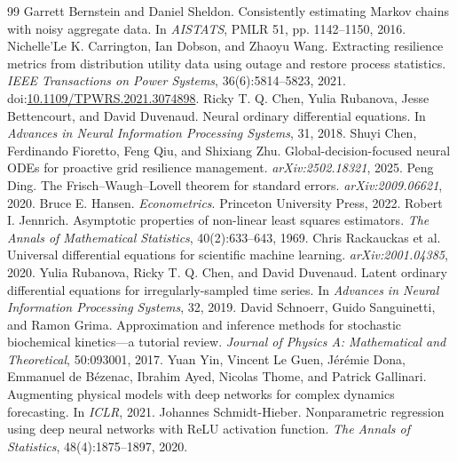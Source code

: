 \begin{thebibliography}{99}
Garrett Bernstein and Daniel Sheldon. Consistently estimating Markov chains with noisy aggregate data. In \emph{AISTATS}, PMLR 51, pp. 1142--1150, 2016.
Nichelle'Le K. Carrington, Ian Dobson, and Zhaoyu Wang. Extracting resilience metrics from distribution utility data using outage and restore process statistics. \emph{IEEE Transactions on Power Systems}, 36(6):5814--5823, 2021. doi:\url{10.1109/TPWRS.2021.3074898}.
Ricky T. Q. Chen, Yulia Rubanova, Jesse Bettencourt, and David Duvenaud. Neural ordinary differential equations. In \emph{Advances in Neural Information Processing Systems}, 31, 2018.
Shuyi Chen, Ferdinando Fioretto, Feng Qiu, and Shixiang Zhu. Global-decision-focused neural ODEs for proactive grid resilience management. \emph{arXiv:2502.18321}, 2025.
Peng Ding. The Frisch--Waugh--Lovell theorem for standard errors. \emph{arXiv:2009.06621}, 2020.
Bruce E. Hansen. \emph{Econometrics}. Princeton University Press, 2022.
Robert I. Jennrich. Asymptotic properties of non-linear least squares estimators. \emph{The Annals of Mathematical Statistics}, 40(2):633--643, 1969.
Chris Rackauckas et al. Universal differential equations for scientific machine learning. \emph{arXiv:2001.04385}, 2020.
Yulia Rubanova, Ricky T. Q. Chen, and David Duvenaud. Latent ordinary differential equations for irregularly-sampled time series. In \emph{Advances in Neural Information Processing Systems}, 32, 2019.
David Schnoerr, Guido Sanguinetti, and Ramon Grima. Approximation and inference methods for stochastic biochemical kinetics---a tutorial review. \emph{Journal of Physics A: Mathematical and Theoretical}, 50:093001, 2017.
Yuan Yin, Vincent Le Guen, J\'er\'emie Dona, Emmanuel de B\'ezenac, Ibrahim Ayed, Nicolas Thome, and Patrick Gallinari. Augmenting physical models with deep networks for complex dynamics forecasting. In \emph{ICLR}, 2021.
Johannes Schmidt-Hieber. Nonparametric regression using deep neural networks with ReLU activation function. \emph{The Annals of Statistics}, 48(4):1875--1897, 2020.

\end{thebibliography}
